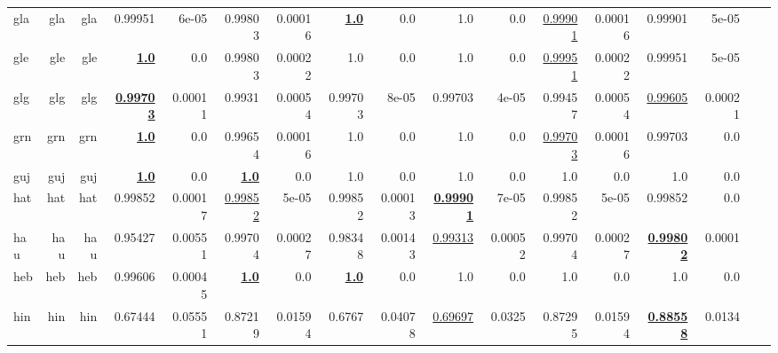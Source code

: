 \documentclass[11pt]{article}
\begin{document}
\begin{table*}[h]
{\begin{tabular}{lrrrrrrrrrrrrrrrr}
gla         & gla         & gla         & 0.99951         & 6e-05         & 0.99803         & 0.00016         & \textbf{\underline{1.0}}         & 0.0         & 1.0         & 0.0         & \underline{0.99901}         & 0.00016         & 0.99901         & 5e-05         \\
gle         & gle         & gle         & \textbf{\underline{1.0}}         & 0.0         & 0.99803         & 0.00022         & 1.0         & 0.0         & 1.0         & 0.0         & \underline{0.99951}         & 0.00022         & 0.99951         & 5e-05         \\
glg         & glg         & glg         & \textbf{\underline{0.99703}}         & 0.00011         & 0.9931         & 0.00054         & 0.99703         & 8e-05         & 0.99703         & 4e-05         & 0.99457         & 0.00054         & \underline{0.99605}         & 0.00021         \\
grn         & grn         & grn         & \textbf{\underline{1.0}}         & 0.0         & 0.99654         & 0.00016         & 1.0         & 0.0         & 1.0         & 0.0         & \underline{0.99703}         & 0.00016         & 0.99703         & 0.0         \\
guj         & guj         & guj         & \textbf{\underline{1.0}}         & 0.0         & \textbf{\underline{1.0}}         & 0.0         & 1.0         & 0.0         & 1.0         & 0.0         & 1.0         & 0.0         & 1.0         & 0.0         \\
hat         & hat         & hat         & 0.99852         & 0.00017         & \underline{0.99852}         & 5e-05         & 0.99852         & 0.00013         & \textbf{\underline{0.99901}}         & 7e-05         & 0.99852         & 5e-05         & 0.99852         & 0.0         \\
hau         & hau         & hau         & 0.95427         & 0.00551         & 0.99704         & 0.00027         & 0.98348         & 0.00143         & \underline{0.99313}         & 0.00052         & 0.99704         & 0.00027         & \textbf{\underline{0.99802}}         & 0.0001         \\
heb         & heb         & heb         & 0.99606         & 0.00045         & \textbf{\underline{1.0}}         & 0.0         & \textbf{\underline{1.0}}         & 0.0         & 1.0         & 0.0         & 1.0         & 0.0         & 1.0         & 0.0         \\
hin         & hin         & hin         & 0.67444         & 0.05551         & 0.87219         & 0.01594         & 0.6767         & 0.04078         & \underline{0.69697}         & 0.0325         & 0.87295         & 0.01594         & \textbf{\underline{0.88558}}         & 0.0134         \\

\end{tabular}}
\end{table*}
\end{document}
